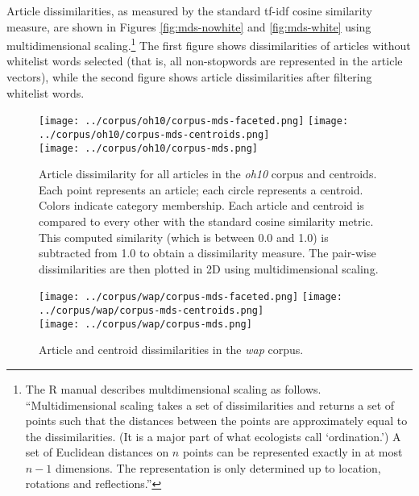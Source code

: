\documentclass{article}
\begin{document}
Article dissimilarities, as measured by the standard tf-idf cosine similarity
measure, are shown in Figures \ref{fig:mds-nowhite} and \ref{fig:mds-white}
using multidimensional scaling.\footnote{The R manual describes multdimensional
scaling as follows. ``Multidimensional scaling takes a set of dissimilarities
and returns a set of points such that the distances between the points are
approximately equal to the dissimilarities. (It is a major part of what
ecologists call `ordination.') A set of Euclidean distances on $n$ points can
be represented exactly in at most $n-1$ dimensions. The representation is only
determined up to location, rotations and reflections.''} The first figure shows
dissimilarities of articles without whitelist words selected (that is, all
non-stopwords are represented in the article vectors), while the second figure
shows article dissimilarities after filtering whitelist words.

\begin{figure}
\begin{center}
\texttt{[image: ../corpus/oh10/corpus-mds-faceted.png]}
\texttt{[image: ../corpus/oh10/corpus-mds-centroids.png]}\\
\texttt{[image: ../corpus/oh10/corpus-mds.png]}

\caption{Article dissimilarity for all articles in the \textit{oh10} corpus and
centroids. Each point represents an article; each circle represents a centroid.
Colors indicate category membership. Each article and centroid is compared to
every other with the standard cosine similarity metric. This computed
similarity (which is between 0.0 and 1.0) is subtracted from 1.0 to obtain
a dissimilarity measure. The pair-wise dissimilarities are then plotted in 2D
using multidimensional scaling.}

\label{fig:mds-oh10}
\end{center}
\end{figure}


\begin{figure}
\begin{center}
\texttt{[image: ../corpus/wap/corpus-mds-faceted.png]}
\texttt{[image: ../corpus/wap/corpus-mds-centroids.png]}\\
\texttt{[image: ../corpus/wap/corpus-mds.png]}
\caption{Article and centroid dissimilarities in the \textit{wap} corpus.}

\label{fig:mds-wap}
\end{center}
\end{figure}
\end{document}
